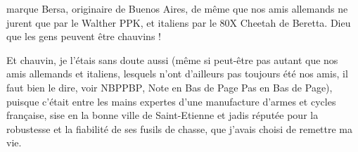 marque Bersa, originaire  de Buenos Aires, de même que nos amis allemands ne jurent que par le Walther PPK, et italiens par le 80X Cheetah de Beretta. Dieu que les gens peuvent être chauvins !

Et chauvin, je l’étais sans doute aussi (même si peut-être pas autant que nos amis allemands et italiens, lesquels n’ont d’ailleurs pas toujours été nos amis, il faut bien le dire, voir \textsc{NBPPBP}, Note en Bas de Page Pas en Bas de Page), puisque c’était entre les mains expertes d’une manufacture d’armes et cycles française, sise en la bonne ville de Saint-Etienne et jadis réputée pour la robustesse et la fiabilité de ses fusils de chasse, que j’avais choisi de remettre ma vie.

%

